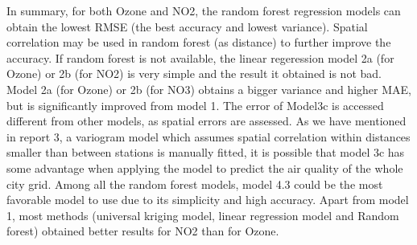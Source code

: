 \documentclass{article}
\begin{document}
In summary, for both Ozone and NO2, the random forest regression models can obtain the lowest RMSE (the best accuracy and lowest variance). Spatial correlation may be used in random forest (as distance) to further improve the accuracy. If random forest is not available, the linear regeression model 2a (for Ozone) or 2b (for NO2) is very simple and the result it obtained is not bad. Model 2a (for Ozone) or 2b (for NO3) obtains a bigger variance and higher MAE, but is significantly improved from model 1. The error of Model3c is accessed different from other models, as spatial errors are assessed. As we have mentioned in report 3, a variogram model which assumes spatial correlation within distances smaller than between stations is manually fitted, it is possible that model 3c has some advantage when applying the model to predict the air quality of the whole city grid. Among all the random forest models, model 4.3 could be the most favorable model to use due to its simplicity and high accuracy. Apart from model 1, most methods (universal kriging model, linear regression model and Random forest) obtained better results for NO2 than for Ozone.   


%
\end{document}
